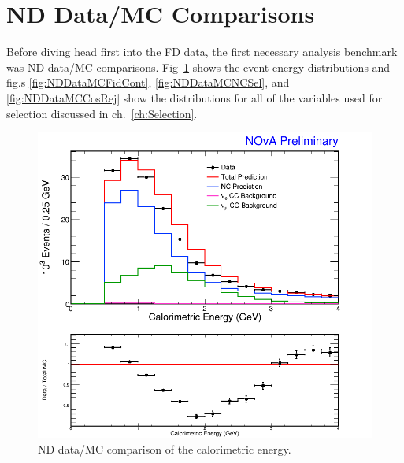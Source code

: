 \section{ND Data/MC Comparisons}

Before diving head first into the FD data, the first necessary analysis benchmark was ND data/MC comparisons. Fig~\ref{fig:NDDataMCECal} shows the event energy distributions and fig.s \ref{fig:NDDataMCFidCont}, \ref{fig:NDDataMCNCSel}, and \ref{fig:NDDataMCCosRej} show the distributions for all of the variables used for selection discussed in ch.~\ref{ch:Selection}.
\begin{figure}[!h]
  \centering
  \includegraphics[width=1\textwidth]{figures/NDDataMC/ECalNusNDRat.png}
  \caption[ND Data/MC Comparison: Energy Distribution]{ND data/MC comparison of the calorimetric energy.}
  \label{fig:NDDataMCECal}
\end{figure}

